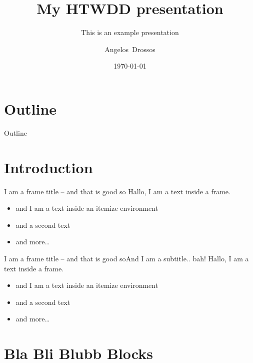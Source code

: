 \documentclass[]{beamer}
\title[My Presentation]{My HTWDD presentation}
\subtitle{This is an example presentation}
\author[A.~Drossos]{Angelos~Drossos}
\institute[HTWDD]{University of Applied Sciences Dresden}
\date{\today} %
\begin{document}
%
%

\frame[plain]{\titlepage}

%
%
\section*{Outline}

\begin{frame}{Outline}
	\tableofcontents[hideallsubsections]
\end{frame}

%
%
\section{Introduction}

\begin{frame}{\secname{}}
\end{frame}

\begin{frame}{I am a frame title -- and that is good so}
Hallo, I am a text inside a frame.

\vfill

\begin{itemize}
\item and I am a text inside an itemize environment
\item and a second text
\item and more\ldots
\end{itemize}
\end{frame}


\begin{frame}{I am a frame title -- and that is good so}{And I am a subtitle.. bah!}
Hallo, I am a text inside a frame.

\vfill

\begin{itemize}
\item and I am a text inside an itemize environment
\item and a second text
\item and more\ldots
\end{itemize}
\end{frame}


%
%
\section{Bla Bli Blubb Blocks}
\end{document}
